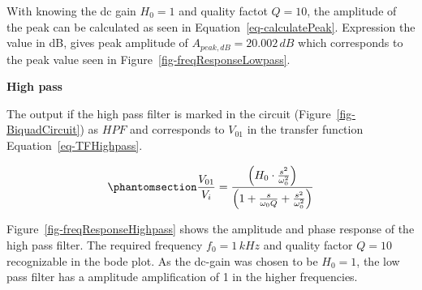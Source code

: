 \documentclass[
  letterpaper,
]{scrbook}
\begin{document}
With knowing the dc gain \(H_0 = 1\) and quality factot \(Q = 10\), the
amplitude of the peak can be calculated as seen in
Equation~\ref{eq-calculatePeak}. Expression the value in dB, gives peak
amplitude of \(A_{peak,dB} = 20.002\,dB\) which corresponds to the peak
value seen in Figure~\ref{fig-freqResponseLowpass}.

\textbf{High pass}

The output if the high pass filter is marked in the circuit
(Figure~\ref{fig-BiquadCircuit}) as \(HPF\) and corresponds to
\(V_{01}\) in the transfer function Equation~\ref{eq-TFHighpass}.

\begin{equation}\phantomsection\label{eq-TFHighpass}{
\frac{V_{01}}{V_i} = \frac{\left( H_0 \cdot \frac{s^2}{\omega_0^2} \right)}{\left( 1 + \frac{s}{\omega_0 Q} + \frac{s^2}{\omega_0^2} \right)} 
}\end{equation}

Figure~\ref{fig-freqResponseHighpass} shows the amplitude and phase
response of the high pass filter. The required frequency
\(f_0 = 1\,kHz\) and quality factor \(Q = 10\) recognizable in the bode
plot. As the dc-gain was chosen to be \(H_0 = 1\), the low pass filter
has a amplitude amplification of 1 in the higher frequencies.
\end{document}
